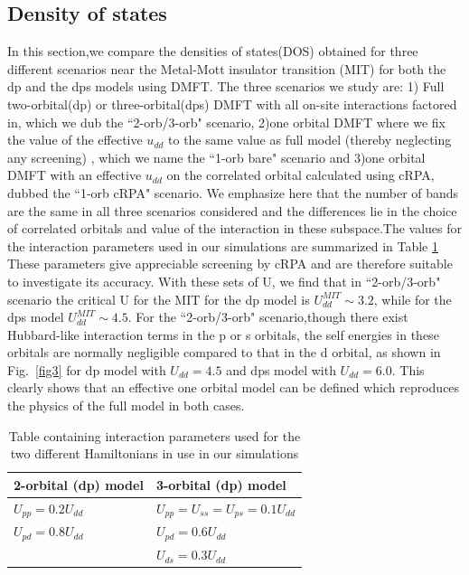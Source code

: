 \documentclass[10pt]{ruthesis}
\begin{document}
{\subsection{\label{DOS}Density of states}
In this section,we compare the densities of states(DOS) obtained for three different scenarios near the Metal-Mott insulator transition (MIT) for both the dp and the dps models using DMFT. The three scenarios we study are: 1) Full two-orbital(dp) or three-orbital(dps) DMFT with all on-site interactions factored in, which we  dub the ``2-orb/3-orb" scenario, 2)one orbital DMFT  where we fix the value of the effective $u_{dd}$ to the same value as full model (thereby neglecting any screening) , which we name the ``1-orb bare" scenario and 3)one orbital DMFT with an effective $u_{dd}$ on the correlated orbital calculated using cRPA,  dubbed the ``1-orb cRPA" scenario. We emphasize here that the number of bands are the same in all three scenarios considered and the differences lie in the choice of correlated orbitals and value of the interaction in these subspace.The values for the interaction parameters used in our simulations are summarized in Table \ref{U_table} These parameters give appreciable screening by cRPA and are therefore suitable to investigate its accuracy. With these sets of U, we find that in ``2-orb/3-orb" scenario the critical U for the MIT for the dp model is $U^{MIT}_{dd}\sim 3.2$, while for the dps model  $U^{MIT}_{dd}\sim 4.5$. For the ``2-orb/3-orb" scenario,though there exist Hubbard-like interaction terms in the p or s orbitals, the self energies in these orbitals are normally negligible compared to that in the d orbital, as shown in Fig.~\ref{fig3}  for dp model with $U_{dd}=4.5$ and dps model with $U_{dd}=6.0$. This clearly shows that an effective one orbital model can be defined which reproduces the physics of the full model in both cases.

\begin{table} [H]
\begin{center}
\begin{tabular}{|l|l|}
\hline  
  2-orbital (dp) model & 3-orbital (dp) model\\
  \hline
   
   $U_{pp}=0.2U_{dd}$  & $U_{pp}=U_{ss}=U_{ps}=0.1U_{dd}$ \\
   
  
  $U_{pd}=0.8U_{dd}$ & $U_{pd}=0.6U_{dd}$\\
   & $U_{ds}=0.3U_{dd}$ \\
  \hline
\end{tabular}
\end{center}
\caption{\label{U_table}Table containing interaction parameters used for the two different Hamiltonians in use in our simulations }
\end{table}


}
\end{document}
